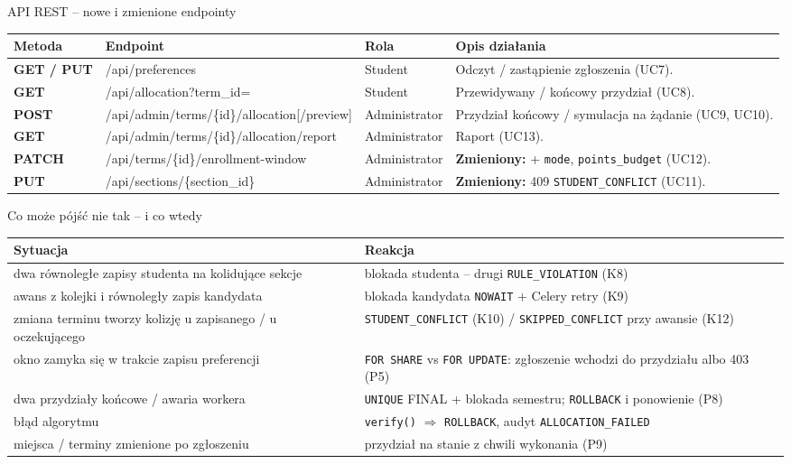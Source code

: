 \documentclass[aspectratio=169, 10pt, xcolor=table]{beamer}
\renewcommand{\arraystretch}{1.18}
\begin{document}
\begin{frame}{API REST -- nowe i zmienione endpointy}
    \scriptsize
    \renewcommand{\arraystretch}{1.12}
    \begin{tabularx}{\textwidth}{@{} >{\bfseries\color{BlueBrand}}l M{0.33\textwidth} L{0.12\textwidth} Y @{}}
        \toprule
        \textbf{Metoda} & \textbf{Endpoint} & \textbf{Rola} & \textbf{Opis działania} \\
        \midrule
        GET / PUT & /api/preferences & Student & Odczyt / zastąpienie zgłoszenia (UC7). \\
        GET & /api/allocation?term\_id= & Student & Przewidywany / końcowy przydział (UC8). \\
        POST & /api/admin/terms/\{id\}/allocation[/preview] & Administrator & Przydział końcowy / symulacja na żądanie (UC9, UC10). \\
        GET & /api/admin/terms/\{id\}/allocation/report & Administrator & Raport (UC13). \\
        PATCH & /api/terms/\{id\}/enrollment-window & Administrator & \textbf{Zmieniony:} + \texttt{mode}, \texttt{points\_budget} (UC12). \\
        PUT & /api/sections/\{section\_id\} & Administrator & \textbf{Zmieniony:} 409 \texttt{STUDENT\_CONFLICT} (UC11). \\
        \bottomrule
    \end{tabularx}
\end{frame}

\begin{frame}{Co może pójść nie tak -- i co wtedy}
    \scriptsize
    \renewcommand{\arraystretch}{1.1}
    \begin{tabularx}{\textwidth}{|L{6cm}|Y|}
        \hline
        \textbf{Sytuacja} & \textbf{Reakcja} \\
        \hline
        dwa równoległe zapisy studenta na kolidujące sekcje & blokada studenta -- drugi \texttt{RULE\_VIOLATION} (K8) \\
        \hline
        awans z kolejki i równoległy zapis kandydata & blokada kandydata \texttt{NOWAIT} + Celery retry (K9) \\
        \hline
        zmiana terminu tworzy kolizję u zapisanego / u oczekującego & \texttt{STUDENT\_CONFLICT} (K10) / \texttt{SKIPPED\_CONFLICT} przy awansie (K12) \\
        \hline
        okno zamyka się w trakcie zapisu preferencji & \texttt{FOR SHARE} vs \texttt{FOR UPDATE}: zgłoszenie wchodzi do przydziału albo 403 (P5) \\
        \hline
        dwa przydziały końcowe / awaria workera & \texttt{UNIQUE} FINAL + blokada semestru; \texttt{ROLLBACK} i ponowienie (P8) \\
        \hline
        błąd algorytmu & \texttt{verify()} $\Rightarrow$ \texttt{ROLLBACK}, audyt \texttt{ALLOCATION\_FAILED} \\
        \hline
        miejsca / terminy zmienione po zgłoszeniu & przydział na stanie z chwili wykonania (P9) \\
        \hline
    \end{tabularx}
\end{frame}
\end{document}
